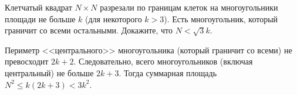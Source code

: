 \problem
Клетчатый квадрат $N \times N$ разрезали по границам клеток на многоугольники
площади не больше $k$ (для некоторого $k > 3$).
Есть многоугольник, который граничит со всеми остальными.
Докажите, что $N < \sqrt{3} k$.

\solution
Периметр <<центрального>> многоугольника (который граничит со всеми) не
превосходит $2 k + 2$.
Следовательно, всего многоугольников (включая центральный) не больше $2 k + 3$.
Тогда суммарная площадь $N^2 \leq k (2 k + 3) < 3 k^2$.

\endproblem
